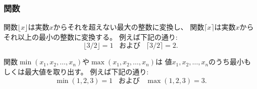 \begin{comment}
\subsubsection{Functions}

The function $\lfloor x \rfloor$ rounds the number $x$
down to an integer, and the function
$\lceil x \rceil$ rounds the number $x$
up to an integer. For example,
\[ \lfloor 3/2 \rfloor = 1 \hspace{10pt} \textrm{and} \hspace{10pt} \lceil 3/2 \rceil = 2.\]

The functions $\min(x_1,x_2,\ldots,x_n)$
and $\max(x_1,x_2,\ldots,x_n)$
give the smallest and largest of values
$x_1,x_2,\ldots,x_n$.
For example,
\[ \min(1,2,3)=1 \hspace{10pt} \textrm{and} \hspace{10pt} \max(1,2,3)=3.\]
\end{comment}

\subsubsection{関数}

関数$\lfloor x \rfloor$は実数$x$からそれを超えない最大の整数に変換し、
関数$\lceil x \rceil$は実数$x$からそれ以上の最小の整数に変換する。
例えば下記の通り:
\[ \lfloor 3/2 \rfloor = 1 \hspace{10pt} \textrm{および} \hspace{10pt} \lceil 3/2 \rceil = 2.\]

関数$\min(x_1,x_2,\ldots,x_n)$や$\max(x_1,x_2,\ldots,x_n)$は
値$x_1,x_2,\ldots,x_n$のうち最小もしくは最大値を取り出す。
例えば下記の通り:
\[ \min(1,2,3)=1 \hspace{10pt} \textrm{および} \hspace{10pt} \max(1,2,3)=3.\]


\begin{comment}
The \key{factorial} $n!$ can be defined
\[\prod_{x=1}^n x = 1 \cdot 2 \cdot 3 \cdot \ldots \cdot n\]
or recursively

\[
\begin{array}{lcl}
0! & = & 1 \\
n! & = & n \cdot (n-1)! \\
\end{array}
\]
\end{comment}

